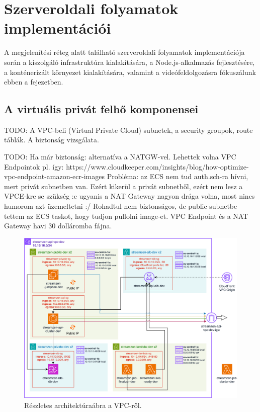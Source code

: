 \chapter{Szerveroldali folyamatok implementációi}

A megjelenítési réteg alatt található szerveroldali folyamatok implementációja során a kiszolgáló infrastruktúra kialakítására, a Node.js-alkalmazás fejlesztésére, a konténerizált környezet kialakítására, valamint a videófeldolgozásra fókuszálunk ebben a fejezetben.

\section{A virtuális privát felhő komponensei}

TODO: A VPC-beli (Virtual Private Cloud) subnetek, a security groupok, route táblák. A biztonság vizsgálata.

TODO: Ha már biztonság: alternatíva a NATGW-vel. Lehettek volna VPC Endpointok pl. így: https://www.cloudkeeper.com/insights/blog/how-optimize-vpc-endpoint-amazon-ecr-images Probléma: az ECS nem tud auth.sch-ra hívni, mert privát subnetben van. Ezért kikerül a privát subnetből, ezért nem lesz a VPCE-kre se szükség :c ugyanis a NAT Gateway nagyon drága volna, most nincs humorom azt üzemeltetni :/
Rohadtul nem biztonságos, de public subnetbe tettem az ECS taskot, hogy tudjon pullolni image-et. VPC Endpoint és a NAT Gateway havi 30 dolláromba fájna.

\begin{figure}[ht]
  \centering
  \includegraphics[width=150mm, keepaspectratio]{figures/dipterv_vpc.png}
  \caption{Részletes architektúraábra a VPC-ről.}
  \label{fig:vpc}
\end{figure}


